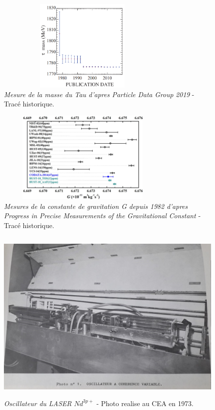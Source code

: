\documentclass[a4paper,12pt]{article}
\begin{document}
\begin{appendix}
\begin{figure}
\centering
\includegraphics[width=8.5cm,height=4.5cm]{./figures/tau-mass-pdg.png}
\caption[Mesures de la masse du Tau depuis 1978]{\textit{Mesure de la masse du Tau d'apres Particle Data Group 2019} - Tracé historique.} 
\label{fig:7:figure7}
\end{figure}

\begin{figure}
\centering
\includegraphics[width=8.5cm,height=4.5cm]{./figures/ProgressinPreciseMeasurementsoftheGravitationalConstant.png}
\caption[Mesures de la constante de gravitation G depuis 1982]{\textit{Mesures de la constante de gravitation G depuis 1982 d'apres Progress in Precise Measurements of the Gravitational Constant \cite{Wu}} - Tracé historique.} 
\label{fig:8:figure8}
\end{figure}

\begin{figure}
\centering
\includegraphics[width=14.5cm,height=8.6cm]{./figures/oscillateur-CEA-multiphotonGroup.jpg}
\caption[Vue de l'oscillateur du LASER $Nd^{3p+}$]{\textit{Oscillateur du LASER $Nd^{3p+}$ } - Photo realise au CEA en 1973.} 
\label{fig:9:figure9}
\end{figure}


\end{appendix}
\end{document}

